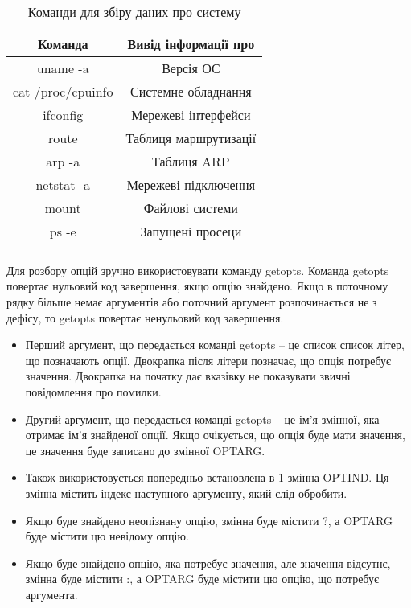 \documentclass[t]{beamer}  %
\begin{document}
\begin{frame}
  \frametitle{\insertsection} 
	\framesubtitle{\insertsubsection}
	\begin{table}
	  \caption{Команди для збіру даних про систему}
	  \label{tab:}
	
	  \begin{center}
	    \begin{tabular}{|c|c|}
	    \hline
	      {\bf Команда} & {\bf Вивід інформації про} \\
	      \hline
	      uname -a & Версія ОС \\
	      \hline
	      cat /proc/cpuinfo & Системне обладнання \\
	      \hline
	      ifconfig & Мережеві інтерфейси \\
	      \hline
	      route & Таблиця маршрутизації \\
	      \hline
	      arp -a & Таблиця ARP\\
	      \hline
	      netstat -a & Мережеві підключення \\
	      \hline
	      mount & Файлові системи \\
	      \hline
	      ps -e & Запущені просеци \\
	    \hline
	    \end{tabular}
	  \end{center}
	\end{table}
\end{frame}	

\begin{frame}
  \frametitle{\insertsection} 
	\framesubtitle{\insertsubsection}
Для розбору опцій зручно використовувати команду getopts. Команда getopts повертає нульовий код завершення, якщо опцію знайдено. Якщо в поточному рядку більше немає аргументів або поточний аргумент розпочинається не з дефісу, то getopts повертає ненульовий код завершення.	
{\scriptsize
\begin{itemize}
  \item Перший аргумент, що передається команді getopts -- це список список літер, що позначають опції. Двокрапка після літери позначає, що опція потребує значення. Двокрапка на початку дає вказівку не показувати звичні повідомлення про помилки.
  \item Другий аргумент, що передається команді getopts -- це ім'я змінної, яка отримає ім'я знайденої опції. Якщо очікується, що опція буде мати значення, це значення буде записано до змінної OPTARG.
  \item Також використовується попередньо встановлена в 1 змінна OPTIND. Ця змінна містить індекс наступного аргументу, який слід обробити. 
  \item Якщо буде знайдено неопізнану опцію, змінна буде містити ?, а OPTARG буде містити цю невідому опцію.
  \item Якщо буде знайдено опцію, яка потребує значення, але значення відсутнє, змінна буде містити :, а OPTARG буде містити цю опцію, що потребує аргумента.
\end{itemize}
}
\end{frame}	
\end{document}
